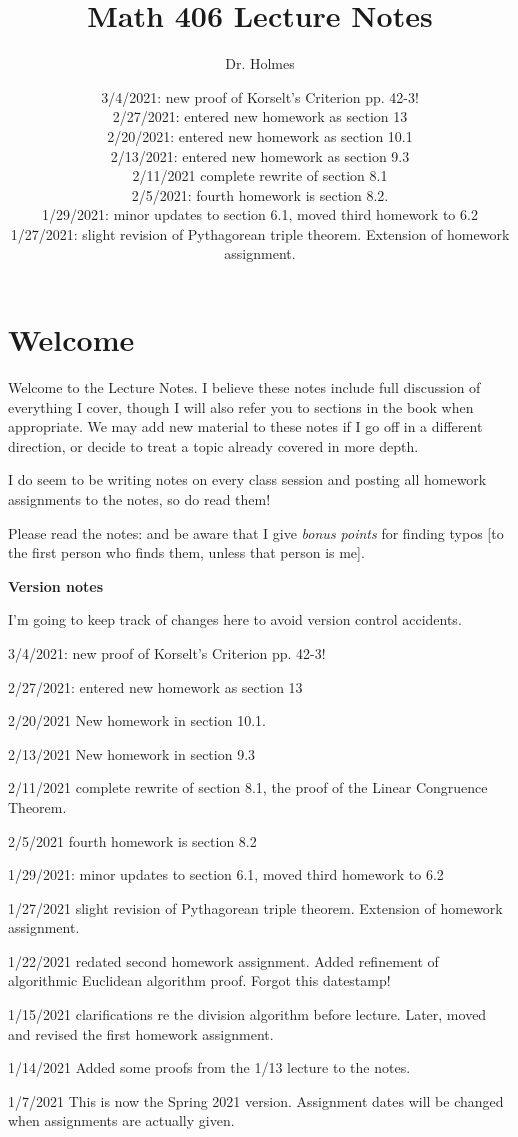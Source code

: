 \documentclass[12pt]{article}
\title{Math 406 Lecture Notes}
\author{Dr. Holmes}
\date{3/4/2021:  new proof of Korselt's Criterion pp. 42-3!\\
2/27/2021:  entered new homework as section 13\\
2/20/2021:  entered new homework as section 10.1\\
2/13/2021:  entered new homework as section 9.3\\
2/11/2021 complete rewrite of section 8.1\\2/5/2021:  fourth homework is section 8.2.\\
1/29/2021:  minor updates to section 6.1, moved third homework to 6.2\\
1/27/2021:  slight revision of Pythagorean triple theorem.  Extension of homework assignment.\\
}
\begin{document}
\maketitle

\section{Welcome}

Welcome to the Lecture Notes.  I believe these notes include full discussion of everything I cover, though I will also refer you to sections in the book when appropriate.  We may add new material to these notes if I go off in a different direction, or decide to treat a topic already covered in more depth.

I do seem to be writing notes on every class session and posting all homework assignments to the notes, so do read them!

Please read the notes:  and be aware that I give {\em bonus points} for finding typos [to the first person who finds them, unless that person is me].

{\bf Version notes}

I'm going to keep track of changes here to avoid version control accidents.

3/4/2021:  new proof of Korselt's Criterion pp. 42-3!

2/27/2021:  entered new homework as section 13

2/20/2021  New homework in section 10.1.

2/13/2021  New homework in section 9.3

2/11/2021 complete rewrite of section 8.1, the proof of the Linear Congruence Theorem.

2/5/2021 fourth homework is section 8.2

1/29/2021:  minor updates to section 6.1, moved third homework to 6.2

1/27/2021   slight revision of Pythagorean triple theorem.  Extension of homework assignment.

1/22/2021  redated second homework assignment.  Added refinement of algorithmic Euclidean algorithm proof.  Forgot this datestamp!

1/15/2021 clarifications re the division algorithm before lecture.  Later, moved and revised the first homework assignment.

1/14/2021  Added some proofs from the 1/13 lecture to the notes.

1/7/2021 This is now the Spring 2021 version.  Assignment dates will be changed when assignments are actually given.
\end{document}
